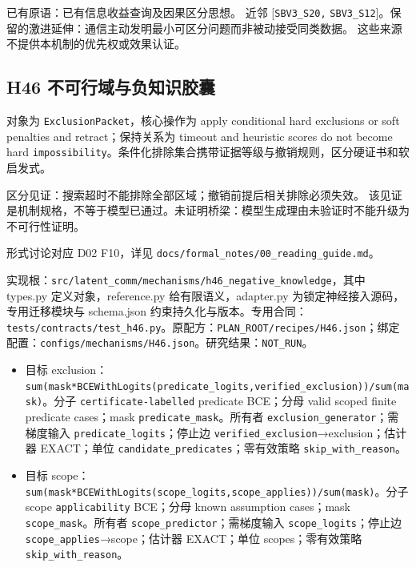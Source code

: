 \documentclass[
  10pt,
]{article}
\begin{document}
已有原语：已有信息收益查询及因果区分思想。 近邻 {[}\nolinkurl{SBV3_S20,}
\nolinkurl{SBV3_S12}{]}。保留的激进延伸：通信主动发明最小可区分问题而非被动接受同类数据。
这些来源不提供本机制的优先权或效果认证。

\subsection{H46
不可行域与负知识胶囊}\label{h46-ux4e0dux53efux884cux57dfux4e0eux8d1fux77e5ux8bc6ux80f6ux56ca}

对象为 \nolinkurl{ExclusionPacket}，核心操作为 apply conditional hard
exclusions or soft penalties and retract；保持关系为 timeout and
heuristic scores do not become hard
\nolinkurl{impossibility}。条件化排除集合携带证据等级与撤销规则，区分硬证书和软启发式。

区分见证：搜索超时不能排除全部区域；撤销前提后相关排除必须失效。
该见证是机制规格，不等于模型已通过。未证明桥梁：模型生成理由未验证时不能升级为不可行性证明。

形式讨论对应 D02 F10，详见
{\small\nolinkurl{docs/formal_notes/00_reading_guide.md}}。

实现根：{\small\nolinkurl{src/latent_comm/mechanisms/h46_negative_knowledge}}，其中
types.py 定义对象，reference.py 给有限语义，adapter.py
为锁定神经接入源码，专用迁移模块与 schema.json
约束持久化与版本。专用合同：{\small\nolinkurl{tests/contracts/test_h46.py}}。原配方：{\small\nolinkurl{PLAN_ROOT/recipes/H46.json}}；绑定配置：{\small\nolinkurl{configs/mechanisms/H46.json}}。研究结果：\nolinkurl{NOT_RUN}。

\begin{itemize}
\item
  目标
  exclusion：{\small\nolinkurl{sum(mask*BCEWithLogits(predicate_logits,verified_exclusion))/sum(mask)}}。分子
  \nolinkurl{certificate-labelled} predicate BCE；分母 valid scoped
  finite predicate cases；mask \nolinkurl{predicate_mask}。所有者
  \nolinkurl{exclusion_generator}；需梯度输入
  \nolinkurl{predicate_logits}；停止边
  \nolinkurl{verified_exclusion}→exclusion；估计器 EXACT；单位
  \nolinkurl{candidate_predicates}；零有效策略
  \nolinkurl{skip_with_reason}。
\item
  目标
  scope：{\small\nolinkurl{sum(mask*BCEWithLogits(scope_logits,scope_applies))/sum(mask)}}。分子
  scope \nolinkurl{applicability} BCE；分母 known assumption cases；mask
  \nolinkurl{scope_mask}。所有者 \nolinkurl{scope_predictor}；需梯度输入
  \nolinkurl{scope_logits}；停止边
  \nolinkurl{scope_applies}→scope；估计器 EXACT；单位 scopes；零有效策略
  \nolinkurl{skip_with_reason}。
\end{itemize}
\end{document}
